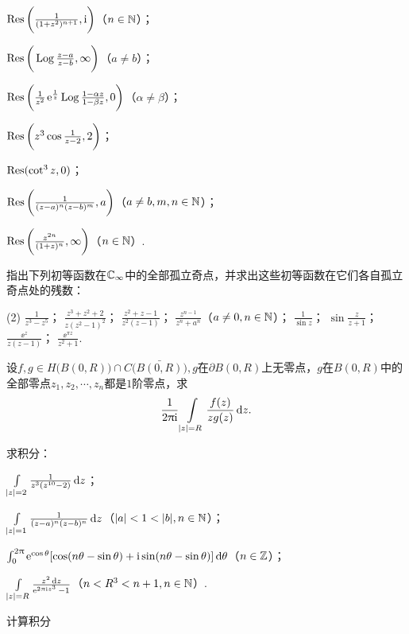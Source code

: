 \begin{xiti}
\begin{enuma}
      \item $\operatorname*{Res}\bigg(\frac1{(1+z^2)^{n+1}},\mathrm i\bigg)$（$n\in\mathbb N$）；
      \item $\operatorname*{Res}\bigg(\operatorname{Log}\frac{z-a}{z-b},\infty\bigg)$（$a\ne b$）；
      \item $\operatorname*{Res}\bigg(\frac1{z^2}\operatorname{\!\!\;\mathrm e}^{\frac1z}\operatorname{Log}\frac{1-\alpha z}{1-\beta z},0\bigg)
           $（$\alpha\ne\beta$）；
      \item $\operatorname*{Res}\bigg(z^3\cos\frac1{z-2},2\bigg)$；
      \item $\operatorname*{Res}(\cot^3z,0)$；
      \item $\operatorname*{Res}\bigg(\frac1{(z-a)^n(z-b)^m},a\bigg)$（$a\ne b,m,n\in\mathbb N$）；
      \item $\operatorname*{Res}\bigg(\frac{z^{2n}}{(1+z)^n},\infty\bigg)$（$n\in\mathbb N$）.
    \end{enuma}
  \item 指出下列初等函数在$\mathbb C_\infty$中的全部孤立奇点，并求出这些初等函数在它们各自孤立奇点处的残数：
    \begin{tasks}(2)
      \task $\frac1{z^3-z^5}$；
      \task $\frac{z^3+z^2+2}{z(z^2-1)^2}$；
      \task $\frac{z^2+z-1}{z^2(z-1)}$；
      \task $\frac{z^{n-1}}{z^n+a^n}$（$a\ne0,n\in\mathbb N$）；
      \task $\frac1{\sin z}$；
      \task $\sin\frac z{z+1}$；
      \task $\frac{\ee^z}{z(z-1)}$；
      \task $\frac{\ee^{\pi z}}{z^2+1}$.
    \end{tasks}
  \item 设$f,g\in H\big(B(0,R)\big)\cap C\big(\bar{B(0,R)}\big),g$在$\partial B(0,R)$上无零点，$g$在$B(0,R)$中的全部零点$z_1,z_2,\cdots,z_n$都是$1$阶零点，求
      \[
        \frac1{2\uppi\mathrm i}\int\limits_{|z|=R}\frac{f(z)}{zg(z)}\mathop{}\!\mathrm dz.
      \]
  \item 求积分：
    \begin{enuma}
      \item $\int\limits_{|z|=2}\frac1{z^3(z^{10}-2)}\mathop{}\!\mathrm dz$；
      \item $\int\limits_{|z|=1}\frac1{(z-a)^n(z-b)^n}\mathop{}\!\mathrm dz$（$|a|<1<|b|,n\in\MN$）；
      \item $\int_0^{2\uppi}\operatorname{\!\!\;\mathrm e}^{\cos\theta}[\cos(n\theta-\sin\theta)+\mathrm i
          \sin(n\theta-\sin\theta)]\mathop{}\!\mathrm{d} \theta$（$n\in\mathbb Z$）；
      \item $\int\limits_{|z|=R}\frac{z^2\mathop{}\!\mathrm dz}{\operatorname{\!\!\;\mathrm e}^{2\uppi\mathrm i z^3}-1}$（$n<R^3<n+1,n\in\mathbb N$）.
    \end{enuma}
  \item 计算积分
\end{xiti}

